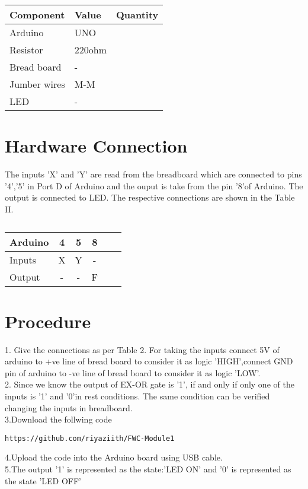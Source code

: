 \documentclass{IEEEtran}
\begin{document}
     \begin{tabularx}{0.4\textwidth} {  
  | >{\centering\arraybackslash}X  
  | >{\centering\arraybackslash}X  
  | >{\centering\arraybackslash}X |}
  \hline
\textbf{Component} &  \textbf{Value} & \textbf{Quantity}\\
\hline
Arduino & UNO & 1 \\  
\hline
Resistor& 220ohm & 1 \\ 
\hline
Bread board & - & 1 \\
\hline
Jumber wires & M-M & 20\\
\hline
LED & - & 1\\
\hline
\end{tabularx}

     
  \section{Hardware Connection}
  The inputs 'X' and 'Y' are read from the breadboard which are connected to pins '4','5' in Port D of Arduino and the ouput is take from the pin '8'of Arduino. The output is connected to LED. The respective connections are shown in the Table II.
	 \begin{table}[htbp]
 \begin{center}
    \begin{tabular}{|l|c|c|c|c|c|} \hline 
  \textbf{Arduino}& \textbf{4} & \textbf{5}&\textbf{8}\\
   \hline
 Inputs&X&Y&-\\ \hline
 Output&-&-&F\\ \hline
\end{tabular}   
\end{center}
\caption{\label{table:dummytable} }
\end{table}


	\section{Procedure}

1. Give the connections as per Table 2. For taking the inputs connect 5V of arduino to +ve line of bread board to consider it as logic 'HIGH',connect GND pin of arduino to -ve line of bread board to consider it as logic 'LOW'.
\\2. Since we know the output of EX-OR gate is '1', if and only if only one of the inputs is '1' and '0'in rest conditions. The same condition can be verified changing the inputs in breadboard.
\\3.Download the follwing code
\begin{lstlisting}
https://github.com/riyaziith/FWC-Module1
\end{lstlisting}
 4.Upload the code into the Arduino board using USB cable.
\\5.The output '1' is represented as the state:'LED ON' and '0' is represented as the state 'LED OFF'
\end{document}
